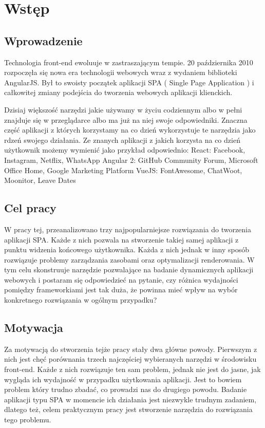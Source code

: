 \chapter{Wstęp}

\section{Wprowadzenie}

Technologia front-end ewoluuje w zastraszającym tempie. 20 października 2010 rozpoczęła się nowa era technologii webowych wraz z wydaniem biblioteki AngularJS. Był to swoisty początek aplikacji SPA ( Single Page Application ) i całkowitej zmiany podejścia do tworzenia webowych aplikacji klienckich. 

Dzisiaj większość narzędzi jakie używamy w życiu codziennym albo w pełni znajduje się w przeglądarce albo ma już na niej swoje odpowiedniki. Znaczna część aplikacji z których korzystamy na co dzień wykorzystuje te narzędzia jako rdzeń swojego działania. Ze znanych aplikacji z jakich korzysta na co dzień użytkownik możemy wymienić jako przykład odpowiednio:
React: Facebook, Instagram, Netflix, WhatsApp
Angular 2: GitHub Community Forum, Microsoft Office Home, Google Marketing Platform
VueJS: FontAwesome, ChatWoot, Moonitor, Leave Dates


\section{Cel pracy}

W pracy tej, przeanalizowano trzy najpopularniejsze rozwiązania do tworzenia aplikacji SPA. Każde z nich pozwala na stworzenie takiej samej aplikacji z punktu widzenia końcowego użytkownika. Każda z nich jednak w inny sposób rozwiązuje problemy zarządzania zasobami oraz optymalizacji renderowania. W tym celu skonstruuje narzędzie pozwalające na badanie dynamicznych aplikacji webowych i postaram się odpowiedzieć na pytanie, czy różnica wydajności pomiędzy frameworkiami jest tak duża, że powinna mieć wpływ na wybór konkretnego rozwiązania w ogólnym przypadku?

\section{Motywacja}

Za motywacją do stworzenia tejże pracy stały dwa główne powody. Pierwszym z nich jest chęć porównania trzech najczęściej wybieranych narzędzi w środowisku front-end. Każde z nich rozwiązuje ten sam problem, jednak nie jest do jasne, jak wygląda ich wydajność w przypadku użytkowania aplikacji. Jest to bowiem problem który trudno zbadać, co prowadzi nas do drugiego powodu. Badanie aplikacji typu SPA w momencie ich działania jest niezwykle trudnym zadaniem, dlatego też, celem praktycznym pracy jest stworzenie narzędzia do rozwiązania tego problemu.


